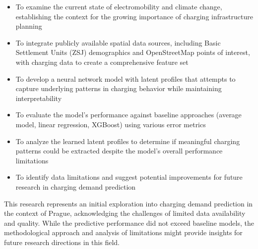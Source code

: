 \begin{itemize}
    \item To examine the current state of electromobility and climate change, establishing the context for the growing importance of charging infrastructure planning

    \item To integrate publicly available spatial data sources, including Basic Settlement Units (ZSJ) demographics and OpenStreetMap points of interest, with charging data to create a comprehensive feature set

    \item To develop a neural network model with latent profiles that attempts to capture underlying patterns in charging behavior while maintaining interpretability

    \item To evaluate the model's performance against baseline approaches (average model, linear regression, XGBoost) using various error metrics

    \item To analyze the learned latent profiles to determine if meaningful charging patterns could be extracted despite the model's overall performance limitations

    \item To identify data limitations and suggest potential improvements for future research in charging demand prediction
\end{itemize}

This research represents an initial exploration into charging demand prediction in the context of Prague, acknowledging the challenges of limited data availability and quality. While the predictive performance did not exceed baseline models, the methodological approach and analysis of limitations might provide insights for future research directions in this field.
